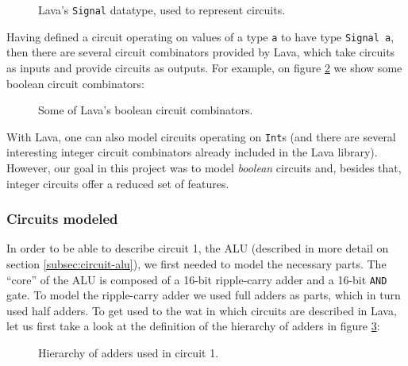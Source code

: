 \documentclass[a4paper]{article}
\begin{document}
            \begin{figure}[h!]
                \begin{center}
                    
                \end{center}
                \caption{Lava's \texttt{Signal} datatype, used to represent circuits.
                    \label{fig:lava-signal}}
            \end{figure}

            Having defined a circuit operating on values of a type \texttt{a} to have type
            \texttt{Signal a}, then there are several circuit combinators provided by Lava, which
            take circuits as inputs and provide circuits as outputs. For example, on figure
            \ref{fig:lava-boolean-combinators} we show some boolean circuit combinators:

            \begin{figure}[h!]
                \begin{center}
                    
                \end{center}
                \caption{Some of Lava's boolean circuit combinators.
                    \label{fig:lava-boolean-combinators}}
            \end{figure}

            With Lava, one can also model circuits operating on \texttt{Int}s (and there are several
            interesting integer circuit combinators already included in the Lava library). However,
            our goal in this project was to model \emph{boolean} circuits and, besides that, integer
            circuits offer a reduced set of features.


            \subsubsection{Circuits modeled}
            \label{subsubsec:lava-circuits}
                In order to be able to describe circuit 1, the ALU (described in more detail on
                section \ref{subsec:circuit-alu}), we first needed to model the necessary
                parts. The ``core'' of the ALU is composed of a 16-bit ripple-carry adder and
                a 16-bit \texttt{AND} gate. To model the ripple-carry adder we used full adders as
                parts, which in turn used half adders. To get used to the wat in which
                circuits are described in Lava, let us first take a look at the definition of the
                hierarchy of adders in figure \ref{fig:lava-circuit1-model-adders}:
                \begin{figure}[h!]
                    \begin{center}
                        
                    \end{center}
                    \caption{Hierarchy of adders used in circuit 1.
                        \label{fig:lava-circuit1-model-adders}}
                \end{figure}
\end{document}
